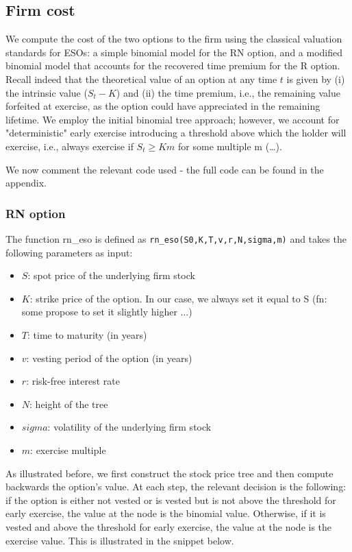 \subsection{Firm cost} 

We compute the cost of the two options to the firm using the classical valuation standards for ESOs: a simple binomial model for the RN option, and a modified binomial model that accounts for the recovered time premium for the R option.
Recall indeed that the theoretical value of an option at any time $t$ is given by (i) the intrinsic value ($S_t - K$) and (ii) the time premium, i.e., the remaining value forfeited at exercise, as the option could have appreciated in the remaining lifetime. 
We employ the \cite{cox1979option} initial binomial tree approach; however, we account for "deterministic" early exercise introducing a threshold above which the holder will exercise, i.e., always exercise if $S_t \ge Km$ for some multiple m (\dots).

We now comment the relevant code used - the full code can be found in the appendix.

\subsubsection*{RN option}
The function rn\_eso is defined as \verb|rn_eso(S0,K,T,v,r,N,sigma,m)| and takes the following parameters as input:
\begin{itemize}
    \item $S$: spot price of the underlying firm stock
    \item $K$: strike price of the option. In our case, we always set it equal to S (fn: some propose to set it slightly higher ...)
    \item $T$: time to maturity (in years)
    \item $v$: vesting period of the option (in years)
    \item $r$: risk-free interest rate
    \item $N$: height of the tree
    \item $sigma$: volatility of the underlying firm stock
    \item $m$: exercise multiple
\end{itemize}
    
 As illustrated before, we first construct the stock price tree and then compute backwards the option's value. At each step, the relevant decision is the following: if the option is either not vested or is vested but is not above the threshold for early exercise, the value at the node is the binomial value. Otherwise, if it is vested and above the threshold for early exercise, the value at the node is the exercise value. This is illustrated in the snippet below.

